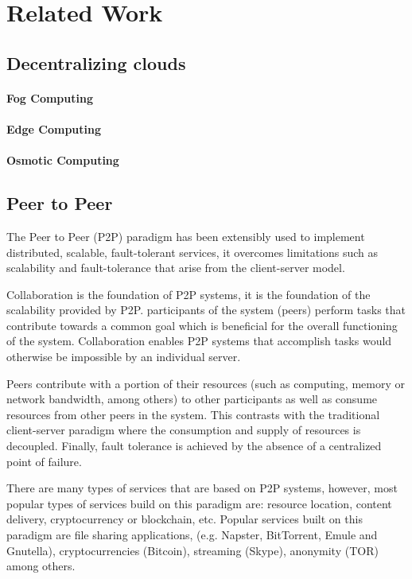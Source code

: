 \chapter{Related Work}
\label{cha:related_work}

\section{Decentralizing clouds}

\subsubsection{Fog Computing}

\subsubsection{Edge Computing}

\subsubsection{Osmotic Computing}

\section{Peer to Peer} %
\label{sec:p2p}

The Peer to Peer (P2P) paradigm has been extensibly used to implement distributed, scalable, fault-tolerant services, it overcomes limitations such as scalability and fault-tolerance that arise from the client-server model. 

Collaboration is the foundation of P2P systems, it is the foundation of the scalability provided by P2P. participants of the system (peers) perform tasks that contribute towards a common goal which is beneficial for the overall functioning of the system. Collaboration enables P2P systems that accomplish tasks would otherwise be impossible by an individual server.  %

Peers contribute with a portion of their resources (such as computing, memory or network bandwidth, among others) to other participants as well as consume resources from other peers in the system. This contrasts with the traditional client-server paradigm where the consumption and supply of resources is decoupled. Finally, fault tolerance is achieved by the absence of a centralized point of failure.

There are many types of services that are based on P2P systems, however, most popular types of services build on this paradigm are: resource location, content delivery, cryptocurrency or blockchain, etc. Popular services built on this paradigm are file sharing applications, (e.g. Napster, BitTorrent, Emule and Gnutella), cryptocurrencies (Bitcoin), streaming (Skype), anonymity (TOR) among others. 

